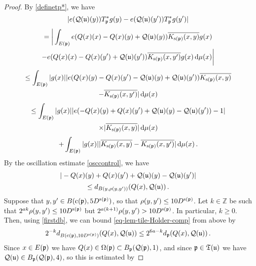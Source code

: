 {    \begin{proof}
        By \eqref{definetp*}, we have
        $$
            |e({\mathcal{Q}}({\mathfrak u})(y)) T_{{\mathfrak p}}^* g(y) - e({\mathcal{Q}}({\mathfrak u})(y')) T_{{\mathfrak p}}^* g(y')|
        $$
        \begin{multline*}
            =\bigg| \int_{E({\mathfrak p})} e({Q}(x)(x) - {Q}(x)(y) + {\mathcal{Q}}({\mathfrak u})(y)) \overline{K_{{\mathrm{s}}({\mathfrak p})}(x, y)} g(x) \\
            -  e({Q}(x)(x) - {Q}(x)(y') + {\mathcal{Q}}({\mathfrak u})(y')) \overline{K_{{\mathrm{s}}({\mathfrak p})}(x, y')}  g(x) \, \mathrm{d}\mu(x)\bigg|
        \end{multline*}
        \begin{multline*}
            \leq\int_{E({\mathfrak p})} |g(x)| |e({Q}(x)(y) - {Q}(x)(y') - {\mathcal{Q}}({\mathfrak u})(y) + {\mathcal{Q}}({\mathfrak u})(y'))\overline{K_{{\mathrm{s}}({\mathfrak p})}(x, y)}\\
            - \overline{K_{{\mathrm{s}}({\mathfrak p})}(x, y')}| \, \mathrm{d}\mu(x)
        \end{multline*}
        \begin{multline}
            \leq\int_{E({\mathfrak p})} |g(x)| |e(-{Q}(x)(y) + {Q}(x)(y') + {\mathcal{Q}}({\mathfrak u})(y) - {\mathcal{Q}}({\mathfrak u})(y')) - 1| \\
            \times |\overline{K_{{\mathrm{s}}({\mathfrak p})}(x, y)}|\, \mathrm{d}\mu(x) \label{T*Hölder1b}
        \end{multline}
        \begin{equation}
            + \int_{E({\mathfrak p})} |g(x)| |\overline{K_{{\mathrm{s}}({\mathfrak p})}(x, y)} - \overline{K_{{\mathrm{s}}({\mathfrak p})}(x, y')} |\, \mathrm{d}\mu(x)\,.\label{T*Hölder1}
        \end{equation}
        By the oscillation estimate \eqref{osccontrol}, we have
        $$
            |-{Q}(x)(y) + {Q}(x)(y') + {\mathcal{Q}}({\mathfrak u})(y) - {\mathcal{Q}}({\mathfrak u})(y')|
        $$
        \begin{equation}
            \label{eq-lem-tile-Holder-comp}
            \le d_{B(y, \rho(y,y'))}({Q}(x), {\mathcal{Q}}({\mathfrak u}))\,.
        \end{equation}
        Suppose that $y, y' \in B({\mathrm{c}}({\mathfrak p}), 5D^{{\mathrm{s}}({\mathfrak p})})$, so that $\rho(y,y') \le 10D^{{\mathrm{s}}({\mathfrak p})}$. Let $k \in \mathbb{Z}$ be such that $2^{ak}\rho(y,y') \le 10D^{{\mathrm{s}}({\mathfrak p})}$ but $2^{a(k+1)} \rho(y,y') > 10D^{{\mathrm{s}}({\mathfrak p})}$. In particular, $k \ge 0$. Then, using \eqref{firstdb}, we can bound \eqref{eq-lem-tile-Holder-comp} from above by
        $$
            2^{-k} d_{B({\mathrm{c}}({\mathfrak p}), 10 D^{{\mathrm{s}}({\mathfrak p})})}({Q}(x), {\mathcal{Q}}({\mathfrak u})) \le 2^{6a - k} d_{{\mathfrak p}}({Q}(x), {\mathcal{Q}}({\mathfrak u}))\,.
        $$
        Since $x \in E({\mathfrak p})$ we have ${Q}(x) \in \Omega({\mathfrak p}) \subset B_{{\mathfrak p}}({\mathcal{Q}}({\mathfrak p}), 1)$, and since ${\mathfrak p} \in {\mathfrak T}({\mathfrak u})$ we have ${\mathcal{Q}}({\mathfrak u}) \in B_{{\mathfrak p}}({\mathcal{Q}}({\mathfrak p}), 4)$, so this is estimated by

\end{proof}}
